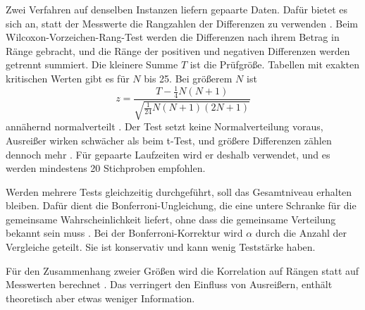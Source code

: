 Zwei Verfahren auf denselben Instanzen liefern gepaarte Daten. Dafür bietet es sich an, statt der Messwerte die Rangzahlen der Differenzen zu verwenden . Beim Wilcoxon-Vorzeichen-Rang-Test werden die Differenzen nach ihrem Betrag in Ränge gebracht, und die Ränge der positiven und negativen Differenzen werden getrennt summiert. Die kleinere Summe $T$ ist die Prüfgröße. Tabellen mit exakten kritischen Werten gibt es für $N$ bis 25. Bei größerem $N$ ist
\begin{equation}
z = \frac{T - \frac{1}{4}N(N+1)}{\sqrt{\frac{1}{24}N(N+1)(2N+1)}}
\end{equation}
annähernd normalverteilt . Der Test setzt keine Normalverteilung voraus, Ausreißer wirken schwächer als beim t-Test, und größere Differenzen zählen dennoch mehr . Für gepaarte Laufzeiten wird er deshalb verwendet, und es werden mindestens 20 Stichproben empfohlen. 

Werden mehrere Tests gleichzeitig durchgeführt, soll das Gesamtniveau erhalten bleiben. Dafür dient die Bonferroni-Ungleichung, die eine untere Schranke für die gemeinsame Wahrscheinlichkeit liefert, ohne dass die gemeinsame Verteilung bekannt sein muss . Bei der Bonferroni-Korrektur wird $\alpha$ durch die Anzahl der Vergleiche geteilt. Sie ist konservativ und kann wenig Teststärke haben. 

Für den Zusammenhang zweier Größen wird die Korrelation auf Rängen statt auf Messwerten berechnet . Das verringert den Einfluss von Ausreißern, enthält theoretisch aber etwas weniger Information. 
